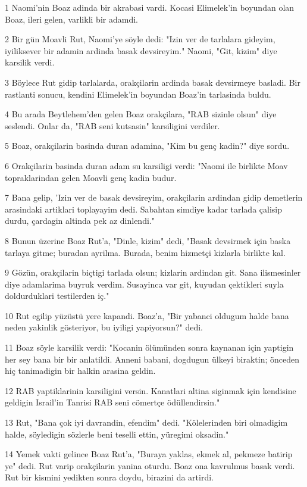 \par 1 Naomi'nin Boaz adinda bir akrabasi vardi. Kocasi Elimelek'in boyundan olan Boaz, ileri gelen, varlikli bir adamdi.
\par 2 Bir gün Moavli Rut, Naomi'ye söyle dedi: "Izin ver de tarlalara gideyim, iyiliksever bir adamin ardinda basak devsireyim." Naomi, "Git, kizim" diye karsilik verdi.
\par 3 Böylece Rut gidip tarlalarda, orakçilarin ardinda basak devsirmeye basladi. Bir rastlanti sonucu, kendini Elimelek'in boyundan Boaz'in tarlasinda buldu.
\par 4 Bu arada Beytlehem'den gelen Boaz orakçilara, "RAB sizinle olsun" diye seslendi. Onlar da, "RAB seni kutsasin" karsiligini verdiler.
\par 5 Boaz, orakçilarin basinda duran adamina, "Kim bu genç kadin?" diye sordu.
\par 6 Orakçilarin basinda duran adam su karsiligi verdi: "Naomi ile birlikte Moav topraklarindan gelen Moavli genç kadin budur.
\par 7 Bana gelip, 'Izin ver de basak devsireyim, orakçilarin ardindan gidip demetlerin arasindaki artiklari toplayayim dedi. Sabahtan simdiye kadar tarlada çalisip durdu, çardagin altinda pek az dinlendi."
\par 8 Bunun üzerine Boaz Rut'a, "Dinle, kizim" dedi, "Basak devsirmek için baska tarlaya gitme; buradan ayrilma. Burada, benim hizmetçi kizlarla birlikte kal.
\par 9 Gözün, orakçilarin biçtigi tarlada olsun; kizlarin ardindan git. Sana ilismesinler diye adamlarima buyruk verdim. Susayinca var git, kuyudan çektikleri suyla doldurduklari testilerden iç."
\par 10 Rut egilip yüzüstü yere kapandi. Boaz'a, "Bir yabanci oldugum halde bana neden yakinlik gösteriyor, bu iyiligi yapiyorsun?" dedi.
\par 11 Boaz söyle karsilik verdi: "Kocanin ölümünden sonra kaynanan için yaptigin her sey bana bir bir anlatildi. Anneni babani, dogdugun ülkeyi biraktin; önceden hiç tanimadigin bir halkin arasina geldin.
\par 12 RAB yaptiklarinin karsiligini versin. Kanatlari altina siginmak için kendisine geldigin Israil'in Tanrisi RAB seni cömertçe ödüllendirsin."
\par 13 Rut, "Bana çok iyi davrandin, efendim" dedi. "Kölelerinden biri olmadigim halde, söyledigin sözlerle beni teselli ettin, yüregimi oksadin."
\par 14 Yemek vakti gelince Boaz Rut'a, "Buraya yaklas, ekmek al, pekmeze batirip ye" dedi. Rut varip orakçilarin yanina oturdu. Boaz ona kavrulmus basak verdi. Rut bir kismini yedikten sonra doydu, birazini da artirdi.
